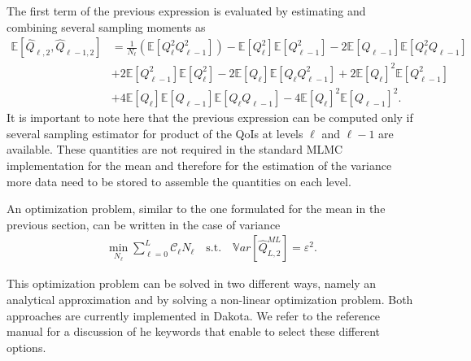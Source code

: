 The first term of the previous expression is evaluated by estimating and combining several sampling moments as
\begin{equation}
\begin{split}
 \mathbb{E}\left[ \hat{Q}_{\ell,2},\hat{Q}_{\ell-1,2} \right] &= \frac{1}{N_\ell} \left( \mathbb{E}\left[ Q_\ell^2 Q_{\ell-1}^2 \right] \right) - \mathbb{E}\left[ Q_\ell^2 \right] \mathbb{E}\left[Q_{\ell-1}^2 \right] - 2 \mathbb{E}\left[Q_{\ell-1} \right] \mathbb{E}\left[ Q_{\ell}^2 Q_{\ell-1} \right] \\
                                      &+ 2 \mathbb{E}\left[Q_{\ell-1}^2 \right] \mathbb{E}\left[ Q_{\ell}^2 \right]
                                      - 2  \mathbb{E}\left[ Q_{\ell} \right] \mathbb{E}\left[ Q_{\ell} Q_{\ell-1}^2 \right]
                                      + 2 \mathbb{E}\left[ Q_{\ell} \right]^2 \mathbb{E}\left[ Q_{\ell-1}^2 \right] \\
                                      &+ 4 \mathbb{E}\left[ Q_{\ell} \right] \mathbb{E}\left[ Q_{\ell-1} \right] \mathbb{E}\left[ Q_{\ell} Q_{\ell-1} \right]
                                      - 4 \mathbb{E}\left[ Q_{\ell} \right]^2 \mathbb{E}\left[ Q_{\ell-1} \right]^2.
\end{split}
\end{equation}
It is important to note here that the previous expression can be computed only if several sampling estimator for product of the QoIs at levels $\ell$ and $\ell-1$ are available.
These quantities are not required in the standard MLMC implementation for the mean and therefore for the estimation of the variance more data need to be stored to assemble the
quantities on each level.

An optimization problem, similar to the one formulated for the mean in the previous section, can be written in the case of variance 
\begin{equation}\label{EQ:mlmc_optimization_var}
\begin{split}
\min\limits_{N_\ell} \sum_{\ell=0}^L \mathcal{C}_{\ell} N_\ell \quad \mathrm{s.t.} \quad \mathbb{V}ar\left[ \hat{Q}_{L,2}^{ML} \right] = \varepsilon^2.
% 
% 
\end{split}
\end{equation}

This optimization problem can be solved in two different ways, namely an analytical approximation and by solving a non-linear optimization problem. Both approaches are 
currently implemented in Dakota. We refer to the reference manual for a discussion of he keywords that enable to select these different options.


